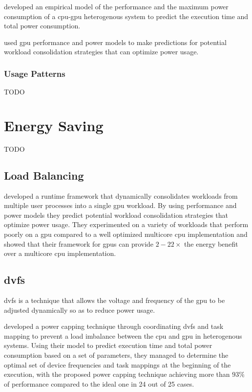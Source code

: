 			\textcite{Komoda2013} developed an empirical model of the performance and the maximum power consumption of a \gls{cpu}-\gls{gpu} heterogenous system to predict the execution time and total power consumption.

			\textcite{Li2011} used \gls{gpu} performance and power models to make predictions for potential workload consolidation strategies that can optimize power usage.

			\subsubsection{Usage Patterns}
				TODO

	\section{Energy Saving}
		TODO
		
		\subsection{Load Balancing}
			\textcite{Li2011} developed a runtime framework that dynamically consolidates workloads from multiple user processes into a single \gls{gpu} workload.
			By using performance and power models they predict potential workload consolidation strategies that optimize power usage.
			They experimented on a variety of workloads that perform poorly on a \gls{gpu} compared to a well optimized multicore \gls{cpu} implementation and showed that their framework for \glspl{gpu} can provide $2-22 \times$ the energy benefit over a multicore \gls{cpu} implementation.

		\subsection{\acrlong{dvfs}}
			\gls{dvfs} is a technique that allows the voltage and frequency of the \gls{gpu} to be adjusted dynamically so as to reduce power usage.

			\textcite{Komoda2013} developed a power capping technique through coordinating \gls{dvfs} and task mapping to prevent a load imbalance between the \gls{cpu} and \gls{gpu} in heterogenous systems.
			Using their model to predict execution time and total power consumption based on a set of parameters, they managed to determine the optimal set of device frequencies and task mappings at the beginning of the execution, with the proposed power capping technique achieving more than $93 \%$ of performance compared to the ideal one in 24 out of 25 cases.